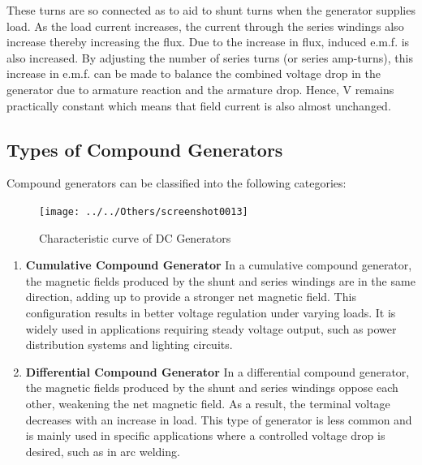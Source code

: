 \documentclass[a4paper,12pt]{article}
\begin{document}
These turns are so connected as to aid to shunt turns when the generator supplies load. As the load current increases, the current through the series windings also increase thereby increasing the flux. Due to the increase in flux, induced e.m.f. is also increased. By adjusting the number of series turns (or series amp-turns), this increase in e.m.f. can be made to balance the combined voltage drop in the generator due to armature reaction and the armature drop. Hence, V remains practically constant which means that field current is also almost unchanged. 

	

	
	\subsection{Types of Compound Generators}
	Compound generators can be classified into the following categories:
	\begin{figure}[H]
		\centering
		\texttt{[image: ../../Others/screenshot0013]}
		\caption{Characteristic curve of DC Generators}
		\label{fig:screenshot0013}
	\end{figure}
	
	\begin{enumerate}
	\item \textbf{Cumulative Compound Generator}
	In a cumulative compound generator, the magnetic fields produced by the shunt and series windings are in the same direction, adding up to provide a stronger net magnetic field. This configuration results in better voltage regulation under varying loads. It is widely used in applications requiring steady voltage output, such as power distribution systems and lighting circuits.
	
\item  \textbf{Differential Compound Generator}
	In a differential compound generator, the magnetic fields produced by the shunt and series windings oppose each other, weakening the net magnetic field. As a result, the terminal voltage decreases with an increase in load. This type of generator is less common and is mainly used in specific applications where a controlled voltage drop is desired, such as in arc welding.
	\end{enumerate}

	
\end{document}
